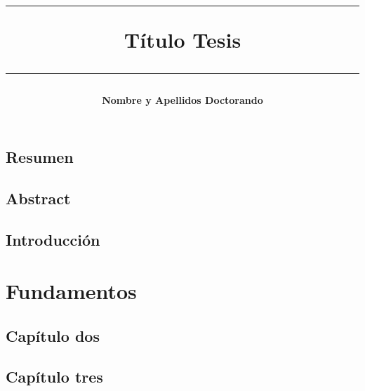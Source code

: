 \documentclass[a4paper,12pt,twoside]{book}
\theoremstyle{remark}
\begin{document}
\title{\hrule\LARGE {\bf Título Tesis\vspace*{2mm}\hrule}\par
 \vspace*{6mm}
}

\author{\textbf{Nombre y Apellidos Doctorando}}

\normallinespacing

\maketitle

\newpage
\thispagestyle{empty}
\mbox{}
\newpage

\newpage
\thispagestyle{empty}
\mbox{}
\newpage

\newpage
\thispagestyle{empty}
\mbox{}
\newpage

\newpage
\thispagestyle{empty}
\mbox{}
\newpage

\newpage
\thispagestyle{empty}

\singlespacing
{}
\setcounter{page}{11}
\body

\chapter*{Resumen}\label{capitulo:Resumen}

\clearpage
\chapter*{Abstract}\label{capitulo:Abstract}
\markboth{}{}

\clearpage
\chapter{Introducción}\label{capitulo:Introduccion}

\clearpage
\part{Fundamentos}
\clearpage
\chapter{Capítulo dos}\label{capitulo:CapituloDos}

\chapter{Capítulo tres}\label{capitulo:CapituloTres}

\clearpage
\end{document}
